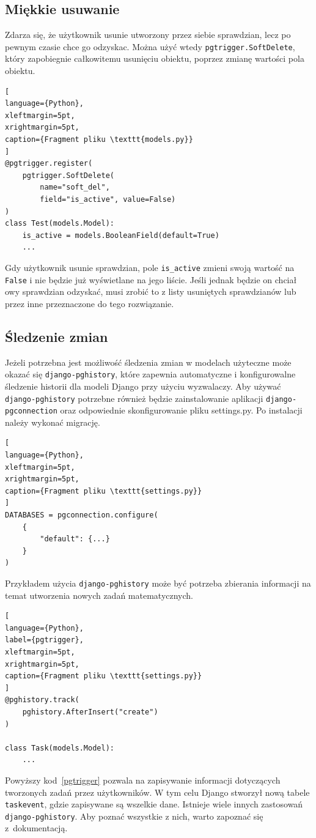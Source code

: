 \documentclass[oneside,polski,logo,indent]{amuthesis}
\begin{document}
\begin{center}
\subsection{Miękkie usuwanie}
\end{center}
Zdarza się, że użytkownik usunie utworzony przez siebie sprawdzian, lecz po pewnym czasie chce go odzyskac. Można użyć wtedy \texttt{pgtrigger.SoftDelete}, który zapobiegnie całkowitemu usunięciu obiektu, poprzez zmianę wartości pola obiektu.
\begin{lstlisting}[
language={Python},
xleftmargin=5pt,
xrightmargin=5pt,
caption={Fragment pliku \texttt{models.py}}
]
@pgtrigger.register(
    pgtrigger.SoftDelete(
        name="soft_del",
        field="is_active", value=False)
)
class Test(models.Model):
    is_active = models.BooleanField(default=True)
    ... 
\end{lstlisting}
Gdy użytkownik usunie sprawdzian, pole \texttt{is\_active} zmieni swoją wartość na \texttt{False} i nie będzie już wyświetlane na jego liście. Jeśli jednak będzie on chciał owy sprawdzian odzyskać, musi zrobić to z listy usuniętych sprawdzianów lub przez inne przeznaczone do tego rozwiązanie.
\begin{center}
\subsection{Śledzenie zmian}
\end{center}

Jeżeli potrzebna jest możliwość śledzenia zmian w modelach użyteczne może okazać się \texttt{django-pghistory}, które zapewnia automatyczne i konfigurowalne śledzenie historii dla modeli Django przy użyciu wyzwalaczy. Aby używać \texttt{django-pghistory} potrzebne również będzie zainstalowanie aplikacji \texttt{django-pgconnection} oraz odpowiednie skonfigurowanie pliku settings.py. Po instalacji należy wykonać migrację.
\begin{lstlisting}[
language={Python},
xleftmargin=5pt,
xrightmargin=5pt,
caption={Fragment pliku \texttt{settings.py}}
]
DATABASES = pgconnection.configure(
    {
        "default": {...}
    }
)

\end{lstlisting}
Przykładem użycia \texttt{django-pghistory} może być potrzeba zbierania informacji na temat utworzenia nowych zadań matematycznych.
\begin{lstlisting}[
language={Python},
label={pgtrigger},
xleftmargin=5pt,
xrightmargin=5pt,
caption={Fragment pliku \texttt{settings.py}}
]
@pghistory.track(
    pghistory.AfterInsert("create")
)

class Task(models.Model):
	...
\end{lstlisting}
Powyższy kod~\ref{pgtrigger} pozwala na zapisywanie informacji dotyczących tworzonych zadań przez użytkowników. W tym celu Django stworzył nową tabele \texttt{taskevent}, gdzie zapisywane są wszelkie dane.
Istnieje wiele innych zastosowań \texttt{django-pghistory}. Aby poznać wszystkie z nich, warto zapoznać się z~dokumentacją.
\end{document}
